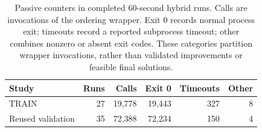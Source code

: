 \begin{table}[htbp]
\centering
\small
\begin{tabular}{lrrrrr}
\toprule
Study & Runs & Calls & Exit 0 & Timeouts & Other \\
\midrule
TRAIN & 27 & 19,778 & 19,443 & 327 & 8 \\
Reused validation & 35 & 72,388 & 72,234 & 150 & 4 \\
\bottomrule
\end{tabular}
\caption{Passive counters in completed 60-second hybrid runs. Calls are
invocations of the ordering wrapper. Exit 0 records normal process exit;
timeouts record a reported subprocess timeout; other combines nonzero or
absent exit codes. These categories partition wrapper invocations, rather
than validated improvements or feasible final solutions.}
\label{tab:ordering-counters}
\end{table}
